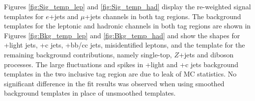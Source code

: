 Figures \ref{fig:Sig_temp_lep} and \ref{fig:Sig_temp_had} display the re-weighted signal templates for $e$+jets and $\mu$+jets channels in both \bt tag regions. %
The background templates for the leptonic and hadronic channels in both \bt tag regions are shown in Figures \ref{fig:Bkg_temp_lep} and \ref{fig:Bkg_temp_had} and show the shapes for \w+light jets, \w+c jets, \w+bb/cc jets, misidentified leptons, and the template for the remaining background contributions, namely single-top, $Z$+jets and diboson processes. The large fluctuations and spikes in \w+light and \w+c jets background templates in the two inclusive \bt tag region are due to leak of MC statistics. %
No significant difference in the fit results was observed when using smoothed background templates in place of unsmoothed templates.


